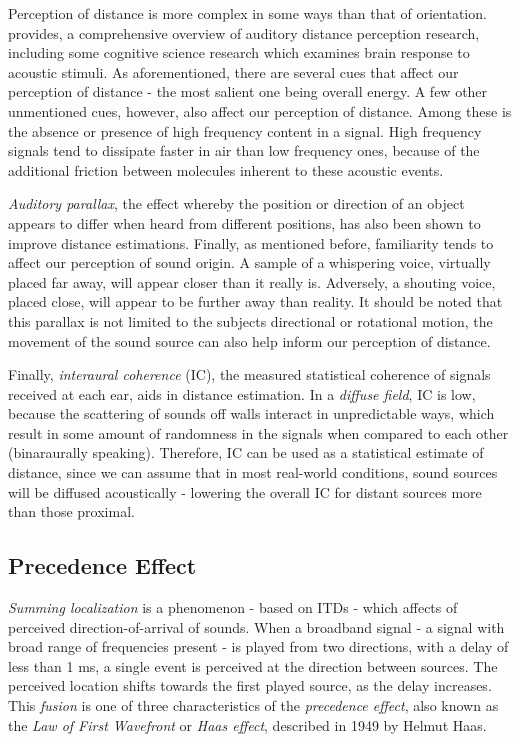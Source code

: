 Perception of distance is more complex in some ways than that of orientation. \cite{zahorik2005auditory} provides, a comprehensive overview of auditory distance perception research, including some cognitive science research which examines brain response to acoustic stimuli. As aforementioned, there are several cues that affect our perception of distance - the most salient one being overall energy. A few other unmentioned cues, however, also affect our perception of distance. Among these is the absence or presence of high frequency content in a signal. High frequency signals tend to dissipate faster in air than low frequency ones, because of the additional friction between molecules inherent to these acoustic events. 

\textit{Auditory parallax}, the effect whereby the position or direction of an object appears to differ when heard from different positions, has also been shown to improve distance estimations. Finally, as mentioned before, familiarity tends to affect our perception of sound origin. A sample of a whispering voice, virtually placed far away, will appear closer than it really is. Adversely, a shouting voice, placed close, will appear to be further away than reality. It should be noted that this parallax is not limited to the subjects directional or rotational motion, the movement of the sound source can also help inform our perception of distance.

Finally, \textit{interaural coherence} (IC), the measured statistical coherence of signals received at each ear, aids in distance estimation. In a \textit{diffuse field}, IC is low, because the scattering of sounds off walls interact in unpredictable ways, which result in some amount of randomness in the signals when compared to each other (binaraurally speaking). Therefore, IC can be used as a statistical estimate of distance, since we can assume that in most real-world conditions, sound sources will be diffused acoustically - lowering the overall IC for distant sources more than those proximal.

\subsection{Precedence Effect}

\textit{Summing localization} is a phenomenon - based on ITDs - which affects of perceived direction-of-arrival of sounds. When a broadband signal - a signal with broad range of frequencies present - is played from two directions, with a delay of less than 1 ms, a single event is perceived at the direction between sources. The perceived location shifts towards the first played source, as the delay increases. This \textit{fusion} is one of three characteristics of the \textit{precedence effect}, also known as the \textit{Law of First Wavefront} or \textit{Haas effect}, described in 1949 by Helmut Haas. 

